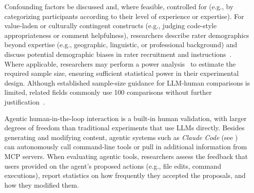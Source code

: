 Confounding factors \should be discussed and, where feasible, controlled for (e.g., by categorizing participants according to their level of experience or expertise).
For value-laden or culturally contingent constructs (e.g., judging code-style appropriateness or comment helpfulness), researchers \should describe rater demographics beyond expertise (e.g., geographic, linguistic, or professional background) and discuss potential demographic biases in rater recruitment and instructions~\cite{bean2025measuring}.
Where applicable, researchers may perform a power analysis~\cite{Cohen1992,DBLP:journals/infsof/DybaKS06} to estimate the required sample size, ensuring sufficient statistical power in their experimental design.
Although established sample-size guidance for LLM-human comparisons is limited, related fields commonly use 100 comparisons without further justification~\cite{DBLP:journals/npjdm/TamSKSPMOWVFMCSPW24}.

Agentic human-in-the-loop interaction is a built-in human validation, with larger degrees of freedom than traditional experiments that use LLMs directly.
Besides generating and modifying content, agentic systems such as \emph{Claude Code} (see \design) can autonomously call command-line tools or pull in additional information from MCP servers.
When evaluating agentic tools, researchers \should assess the feedback that users provided on the agent's proposed actions (e.g., file edits, command executions), report statistics on how frequently they accepted the proposals, and how they modified them.


